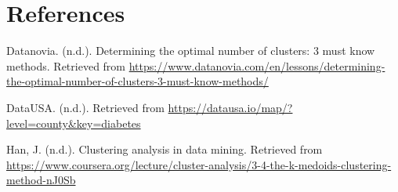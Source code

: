 \documentclass[12pt,twoside]{amherstthesis}
\begin{document}
\begin{Shaded}
\begin{Highlighting}[]
  \StringTok{ }\OperatorTok{~}\StringTok{  }\OperatorTok{+}\StringTok{ }\OperatorTok{+}
  \StringTok{                  }\OperatorTok{:}
  
  \StringTok{ }\OperatorTok{~}\StringTok{ }\OperatorTok{+}\StringTok{ }\OperatorTok{+}
  \StringTok{            }\OperatorTok{:}
  
  \StringTok{ }\OperatorTok{~}\StringTok{ }\OperatorTok{+}\StringTok{ }\OperatorTok{+}
  \StringTok{             }\OperatorTok{:}
  \end{Highlighting}
  \end{Shaded}
  
  \backmatter
  
  \chapter{References}\label{references}
  
  \noindent
  
  \setlength{\parindent}{-0.20in} \setlength{\leftskip}{0.20in}
  \setlength{\parskip}{8pt}
  
  \hypertarget{refs}{}
  \hypertarget{ref-Rec7}{}
  Datanovia. (n.d.). Determining the optimal number of clusters: 3 must
  know methods. Retrieved from
  \url{https://www.datanovia.com/en/lessons/determining-the-optimal-number-of-clusters-3-must-know-methods/}
  
  \hypertarget{ref-data}{}
  DataUSA. (n.d.). Retrieved from
  \url{https://datausa.io/map/?level=county\&key=diabetes}
  
  \hypertarget{ref-Rec13}{}
  Han, J. (n.d.). Clustering analysis in data mining. Retrieved from
  \url{https://www.coursera.org/lecture/cluster-analysis/3-4-the-k-medoids-clustering-method-nJ0Sb}
  
\end{document}
